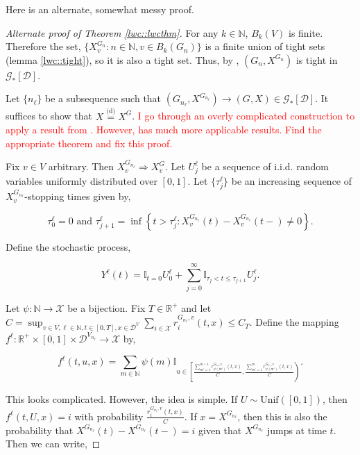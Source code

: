 \documentclass[12pt]{article}
\newcommand{\mb}{\mathbb}
\newcommand{\mc}{\mathcal}
\newcommand{\ra}{\rightarrow}
\newcommand{\te}{\text}
\newcommand{\tr}{\textcolor{red}}
\newcommand{\ind}{\hspace{24pt}}
\newcommand{\deq}{\overset{\text{(d)}}{=}}			%
\newcommand{\cad}{\mc{D}}							%
\newcommand{\sta}{\mc{X}}							%
\newcommand{\Xf}{X}									%
\newcommand{\rate}{r}								%
\newcommand{\xf}{x}									%
\newcommand{\vind}[1]{_{#1}}						%
\newcommand{\tme}[1]{(#1)}							%
\newcommand{\gind}[1]{^{#1}}						%
\newcommand{\stpara}[1]{_{#1}}						%
\newcommand{\gvpara}[2]{^{#1,#2}}					%
\newcommand{\jumpbd}[1]{C_{#1}}						%
\newcommand{\tmepro}[2]{(#1,#2)}					%
\newcommand{\Gs}{\mc{G}_\ast}						%
\newcommand{\trnc}[1]{B_{#1}}						%
\renewcommand{\sp}[1]{[#1]}							%
\newcommand{\Xg}{Y}									%
\newcommand{\rt}{\tau}								%
\renewcommand{\it}[1]{_{#1}}						%
\begin{document}
Here is an alternate, somewhat messy proof.

\begin{proof}[Alternate proof of Theorem \ref{lwc::lwcthm}]
For any \(k \in \mb{N}\), \(\trnc{k}(V)\) is finite. Therefore the set, \(\{\Xf\gind{G\it{n}}\vind{v}: n \in \mb{N}, v \in \trnc{k}(G\it{n})\}\) is a finite union of tight sets (lemma \ref{lwc::tight}), so it is also a tight set. Thus, by \cite[Lemma A.6]{LacRamWu19}, \((G\it{n},\Xf\gind{G\it{n}})\) is tight in \(\Gs\sp{\cad}\).

\ind Let \(\{n_\ell\}\) be a subsequence such that \((G\it{n_\ell},\Xf\gind{G\it{n_\ell}}) \ra (G,\Xf) \in \Gs\sp{\cad}\). It suffices to show that \(\Xf \deq \Xf\gind{G}\). \tr{I go through an overly complicated construction to apply a result from \cite{KurPro91}. However, \cite{Kur91} has much more applicable results. Find the appropriate theorem and fix this proof.}

\ind Fix \(v \in V\) arbitrary. Then \(\Xf\gind{G\it{n_\ell}}\vind{v} \Rightarrow \Xf\gind{G}\vind{v}\). Let \(U\it{j}^\ell\) be a sequence of i.i.d. random variables uniformly distributed over \([0,1]\). Let \(\{\rt\it{j}^\ell\}\) be an increasing sequence of \(\Xf\gind{G\it{n_\ell}}\vind{v}\)-stopping times given by,

\[\rt\it{0}^\ell = 0\te{ and } \rt\it{j+1}^\ell = \inf\left\{t > \rt\it{j}^\ell: \Xf\gind{G\it{n_\ell}}\vind{v}\tme{t} - \Xf\gind{G\it{n_\ell}}\vind{v}\tme{t-} \neq 0\right\}.\]

Define the stochastic process,

\[\Xg^\ell\tme{t} = \mb{I}_{t = 0}U^\ell\it{0} + \sum_{j=0}^\infty \mb{I}_{\rt\it{j} < t \leq \rt\it{j+1}} U^\ell\it{j}.\]

Let \(\psi: \mb{N} \ra \sta\) be a bijection. Fix \(T \in \mb{R}^+\) and let \(C = \sup_{v \in V,\ell \in \mb{N},t \in [0,T],\xf\in\cad^V}\sum_{i\in \sta} \rate\gvpara{G\it{n_\ell}}{v}\stpara{i}\tmepro{t}{\xf}\leq \jumpbd{T}\). Define the mapping \(f^\ell:\mb{R}^+\times [0,1] \times \cad^{V\it{n_\ell}}\ra \sta\) by,

\[f^\ell(t,u,\xf) = \sum_{m\in \mb{N}} \psi(m)\mb{I}_{u \in \left[\frac{\sum_{m'=1}^{m-1} \rate\gvpara{G\it{n_\ell}}{v}\stpara{\psi(m')}\tmepro{t}{\xf}}{C}, \frac{\sum_{m'=1}^{m} \rate\gvpara{G\it{n_\ell}}{v}\stpara{\psi(m')}\tmepro{t}{\xf}}{C}\right)}.\]

This looks complicated. However, the idea is simple. If \(U \sim \te{Unif}([0,1])\), then \(f^\ell(t,U,\xf) = i\) with probability \(\frac{\rate\gvpara{G\it{n_\ell}}{v}\stpara{i}\tmepro{t}{\xf}}{C}\). If \(\xf = \Xf\gind{G\it{n_\ell}}\), then this is also the probability that \(\Xf\gind{G\it{n_\ell}}\tme{t} - \Xf\gind{G\it{n_\ell}}\tme{t-} = i\) given that \(\Xf\gind{G\it{n_\ell}}\) jumps at time \(t\). Then we can write,


\end{proof}
\end{document}
